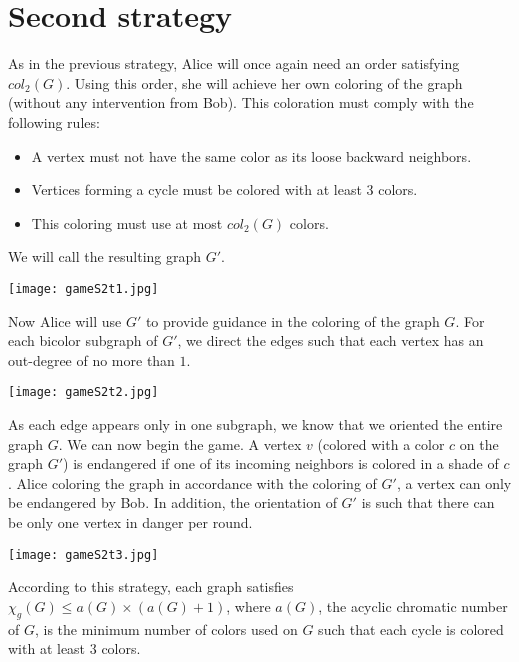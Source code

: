 \section{Second strategy}

As in the previous strategy, Alice will once again need an order satisfying $col_{2}(G)$.
Using this order, she will achieve her own coloring of the graph (without any intervention from Bob).
This coloration must comply with the following rules:
\begin{itemize}
\item A vertex must not have the same color as its loose backward neighbors.
\item Vertices forming a cycle must be colored with at least 3 colors.
\item This coloring must use at most $col_{2}(G)$ colors.
\end{itemize}

We will call the resulting graph $G'$.

\texttt{[image: gameS2t1.jpg]}

Now Alice will use $G'$ to provide guidance in the coloring of the graph $G$. For each bicolor subgraph of $G'$,
we direct the edges such that each vertex has an out-degree of no more than $1$. 

\texttt{[image: gameS2t2.jpg]}

As each edge appears only in
one subgraph, we know that we oriented the entire graph $G$. We can now begin the game. 
A vertex $v$ (colored with a color $c$ on the graph $G'$) is endangered if one of its incoming neighbors is colored in a shade of $c$. Alice coloring the graph in accordance with the coloring of $G'$, a vertex can only be endangered by Bob. In addition, the orientation of $G'$ is such that there can be only one vertex in danger per round.

\texttt{[image: gameS2t3.jpg]}

According to this strategy, each graph satisfies $\chi_{g}(G) \leq a(G) \times (a(G) + 1)$, where $a(G)$, the acyclic chromatic number of $G$, is the minimum number of colors used on $G$ such that each cycle is colored with at least $3$ colors.